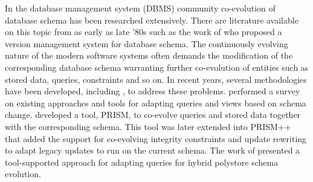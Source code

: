 In the database management system (DBMS) community co-evolution of database schema has been researched extensively. There are literature available on this topic from as early as late '80s such as the work of \textcite{andany1991management} who proposed a version management system for database schema. The continuously evolving nature of the modern software systems often demands the modification of the corresponding database schema warranting further co-evolution of entities such as stored data, queries, constraints and so on. In recent years, several methodologies have been developed, including \cite{younggook2005, HICK2006534, curino2010, Curino2008}, to address these problems. \Textcite{Caruccio2016} performed a survey on existing approaches and tools for adapting queries and views based on schema change. \Textcite{Curino2008} developed a tool, PRISM, to co-evolve queries and stored data together with the corresponding schema. This tool was later extended into PRISM++ that added the support for co-evolving integrity constraints and update rewriting to adapt legacy updates to run on the current schema. The work of \textcite{Fink2020} presented a tool-supported approach for adapting queries for hybrid polystore schema evolution. 
